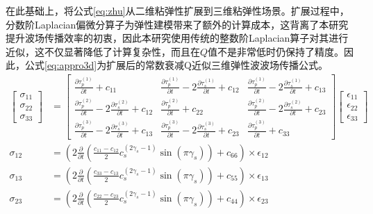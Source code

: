 在此基础上，将公式\ref{eq:zhu}从二维粘弹性扩展到三维粘弹性场景。扩展过程中，分数阶Laplacian偏微分算子为弹性建模带来了额外的计算成本，这背离了本研究提升波场传播效率的初衷，因此本研究使用传统的整数阶Laplacian算子对其进行近似，这不仅显著降低了计算复杂性，而且在$Q$值不是非常低时仍保持了精度\cite{shen2015image}。因此，公式\ref{eq:appro3d}为扩展后的常数衰减Q近似三维弹性波波场传播公式。
\begin{equation}
\begin{aligned}
\begin{bmatrix} \sigma_{11}\\ \sigma_{22}\\ \sigma_{33} \end{bmatrix} &= \begin{bmatrix} \frac{\partial \tau_p^{(1)}}{\partial t} + c_{11} & \frac{\partial \tau_p^{(1)}}{\partial t} - 2\frac{\partial \tau_s^{(1)}}{\partial t} +c_{12}& \frac{\partial \tau_p^{(1)}}{\partial t} - 2\frac{\partial \tau_s^{(1)}}{\partial t} +c_{13} \\ \frac{\partial \tau_p^{(2)}}{\partial t} - 2\frac{\partial \tau_s^{(2)}}{\partial t} +c_{12}& \frac{\partial \tau_p^{(2)}}{\partial t} + c_{22} & \frac{\partial \tau_p^{(2)}}{\partial t} - 2\frac{\partial \tau_s^{(2)}}{\partial t} +c_{23}\\ \frac{\partial \tau_p^{(3)}}{\partial t} - 2\frac{\partial \tau_s^{(3)}}{\partial t} +c_{13} & \frac{\partial \tau_p^{(3)}}{\partial t} - 2\frac{\partial \tau_s^{(3)}}{\partial t} +c_{23} & \frac{\partial \tau_p^{(3)}}{\partial t} + c_{33} \end{bmatrix} \begin{bmatrix} \epsilon_{11}\\ \epsilon_{22}\\ \epsilon_{33} \end{bmatrix} \\
\sigma_{12} &= \left ( 2\frac{\partial}{\partial t} \left( \frac{c_{11}-c_{12}}{2}c_s^{(2\gamma_s-1)}\sin(\pi\gamma_s) \right) + c_{66} \right )\times \epsilon_{12}\\
\sigma_{13} &= \left ( 2\frac{\partial}{\partial t} \left( \frac{c_{33}-c_{13}}{2}c_s^{(2\gamma_s-1)}\sin(\pi\gamma_s) \right) + c_{55} \right )\times \epsilon_{13} \\
\sigma_{23} &= \left ( 2\frac{\partial}{\partial t} \left( \frac{c_{22}-c_{23}}{2}c_s^{(2\gamma_s-1)}\sin(\pi\gamma_s) \right) + c_{44} \right )\times \epsilon_{23}
\end{aligned}
\label{eq:appro3d}
\end{equation}
